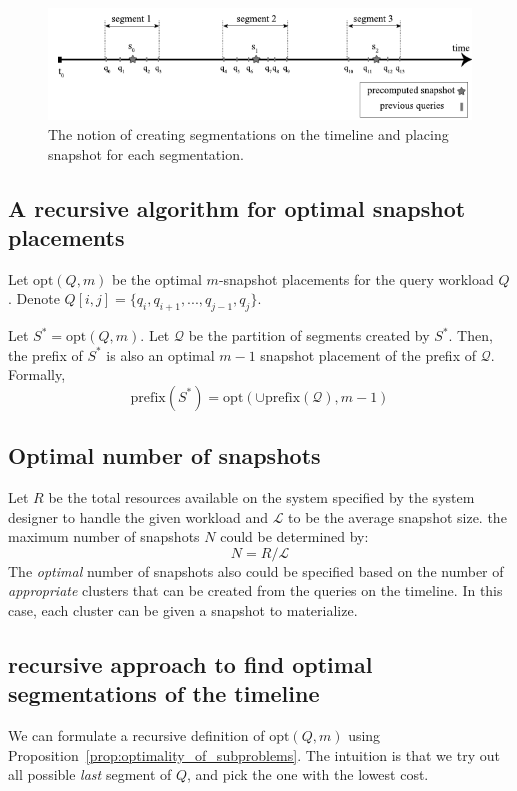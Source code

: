 		\begin{figure}
			\centering
			\includegraphics[width=\textwidth]{figs/segmentations.pdf}
			\caption{The notion of creating segmentations on the timeline and placing snapshot for each segmentation.}
			\label{fig:segmentation}
		\end{figure}

		\subsection{A recursive algorithm for optimal snapshot placements} \label{sec:recursive_algorithm}

			Let $\mathrm{opt}(Q, m)$ be the optimal $m$-snapshot placements for the query workload $Q$. Denote $Q[i,j] = \{q_i,q_{i+1},...,q_{j-1},q_j\}$.

			\begin{prop}
				Let $S^* = \mathrm{opt}(Q, m)$.  Let $\mathcal{Q}$ be the partition of segments created by $S^*$.  Then, the prefix of $S^*$ is also an optimal $m-1$ snapshot placement of the prefix of $\mathcal{Q}$. Formally, $$\mathrm{prefix}(S^*) = \mathrm{opt}(\cup\mathrm{prefix}(\mathcal{Q}), m-1)$$
			\label{prop:optimality_of_subproblems}
			\end{prop}

		\subsection{Optimal number of snapshots} \label{sec:optimal_number_segmentations}
			Let $R$ be the total resources available on the system specified by the system designer to handle the given workload and $\mathcal{L}$ to be the average snapshot size. the maximum number of snapshots $N$ could be determined by: $$N=R/\mathcal{L}$$
			The {\it{optimal}} number of snapshots also could be specified based on the number of {\it{appropriate}} clusters that can be created from the queries on the timeline. In this case, each cluster can be given a snapshot to materialize.

		\subsection{recursive approach to find optimal segmentations of the timeline} \label{sec:optimal_recursive_segmentation}
			We can formulate a recursive definition of $\mathrm{opt}(Q, m)$ using Proposition~\ref{prop:optimality_of_subproblems}. The intuition is that we try out all possible {\em last} segment of $Q$, and pick the one with the lowest cost.

